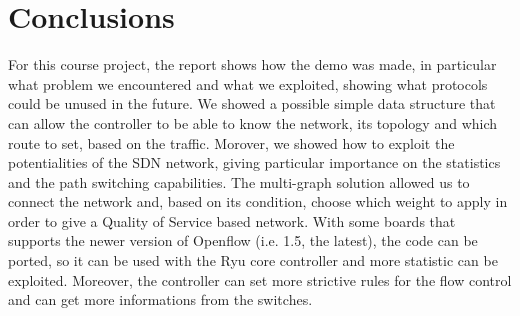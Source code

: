 \documentclass[article,10pt]{IEEEtran}
\begin{document}
\section{Conclusions}\label{sec:conclusion}
For this course project, the report shows how the demo was made, in particular what problem we encountered
and what we exploited, showing what protocols could be unused in the future. We showed a possible simple data structure
that can allow the controller to be able to know the network, its topology and which route to set, based on the traffic.
Morover, we showed how to exploit the potentialities of the SDN network, giving particular importance on the
statistics and the path switching capabilities.
The multi-graph solution allowed us to connect the network and, based on its condition, choose which weight to apply
in order to give a Quality of Service based network. With some boards that supports the newer version of Openflow
(i.e. 1.5, the latest), the code can be ported, so it can be used with the Ryu core controller and more statistic can
be exploited. Moreover, the controller can set more strictive rules for the flow control and can get more informations from the
switches.

\end{document}
